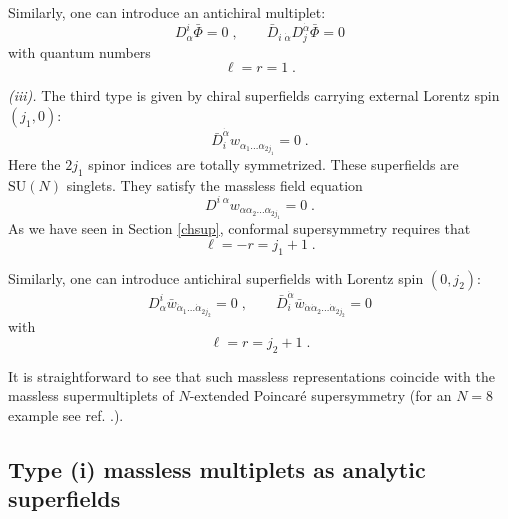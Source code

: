 \documentclass[a4paper,12pt]{article}
\begin{document}
Similarly, one can introduce an antichiral multiplet:
\begin{equation}\label{4.5}
  D^i_\alpha \bar\Phi=0\;, \qquad \bar 
D_{i\;\dot\alpha} D^{\dot\alpha}_j  \bar\Phi=0 
\end{equation}
with quantum numbers
\begin{equation}\label{4.6}
  \ell=r=1\;.
\end{equation}

{\it (iii).} The third type is given by chiral superfields 
carrying external Lorentz spin $(j_1,0)$: 
\begin{equation}\label{4.7}
  \bar D_i^{\dot\alpha} w_{\alpha_1\ldots\alpha_{2j_1}}=0\;.
\end{equation}
Here the $2j_1$ spinor indices are totally symmetrized. These 
superfields are $\mbox{SU}(N)$ singlets. They satisfy the massless 
field equation 
\begin{equation}\label{4.8}
  D^{i\; \alpha}w_{\alpha\alpha_2\ldots\alpha_{2j_1}}=0\;.
\end{equation}
As we have seen in Section \ref{chsup}, conformal supersymmetry 
requires that 
\begin{equation}\label{4.9}
  \ell = -r = j_1+1\;.
\end{equation}

Similarly, one can introduce antichiral superfields with Lorentz 
spin $(0,j_2)$: 
\begin{equation}\label{4.10}
  D^i_\alpha \bar w_{\dot\alpha_1\ldots\dot\alpha_{2j_2}}=0\;, 
\qquad \bar D_i^{\dot\alpha}\bar 
w_{\dot\alpha\dot\alpha_2\ldots\dot\alpha_{2j_2}}=0
\end{equation}
with 
\begin{equation}\label{4.11}
  \ell = r = j_2+1\;.
\end{equation} 

It is straightforward to see that such massless representations 
coincide with the massless supermultiplets of $N$-extended 
Poincar\'e supersymmetry (for an $N=8$ example see ref. 
\cite{gm2}.). 

\subsection{Type (i) massless multiplets as analytic 
superfields}\label{imass} 
\end{document}
